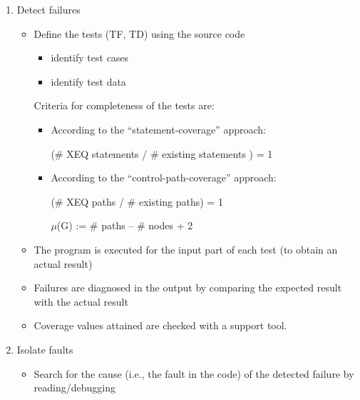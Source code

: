 \begin{enumerate}

\item Detect failures

\begin{itemize}

\item Define the tests (TF, TD) using the source code
\begin{itemize}
\item identify test cases 
\item identify test data
\end{itemize}

Criteria for completeness of the tests are:

\begin{itemize}
\item According to the ``statement-coverage'' approach:

(\# XEQ statements / \# existing statements ) =  1

\item According to the ``control-path-coverage'' approach:

(\# XEQ paths / \# existing paths) = 1

$\mu$(G) := \# paths -- \# nodes + 2

\end{itemize}

\item The program is executed for the input part of each test
(to obtain an actual result)

\item Failures are diagnosed in the output by comparing the expected
result with the actual result

\item Coverage values attained are checked with a support tool.

\end{itemize}


\item Isolate faults

\begin{itemize}

\item Search for the cause (i.e., the fault in the code) of the
detected failure by reading/debugging

\end{itemize}

\end{enumerate}

